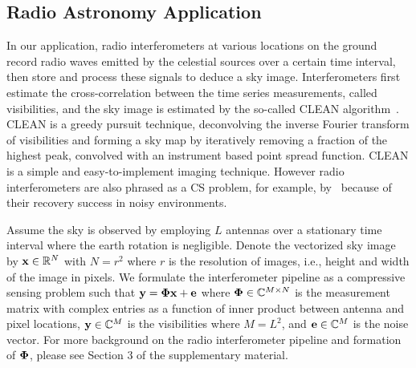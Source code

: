 \documentclass{article}
\begin{document}
\subsection{Radio Astronomy Application}

In our application, radio interferometers at various locations on the ground record radio waves emitted by the celestial sources over a certain time interval, then store and process these signals to deduce a sky image. Interferometers first estimate the cross-correlation between the time series measurements, called visibilities, and the sky image is estimated by the so-called {CLEAN} algorithm~\cite{hogbom1974clean}. {CLEAN} is a greedy pursuit technique, deconvolving the inverse Fourier transform of visibilities and forming a sky map by iteratively removing a fraction of the highest peak, convolved with an instrument based point spread function. CLEAN is a simple and easy-to-implement imaging technique. However radio interferometers are also phrased as a CS problem, for example, by~\cite{wiaux2009csforra, wenger2010csforra, li2011deconvolution} because of their recovery success in noisy environments.

Assume the sky is observed by employing $L$ antennas over a stationary time interval where the earth rotation is negligible. Denote the vectorized sky image by ${\bf x} \in \mathbb{R}^N$ with $N = {r^2}$ where $r$ is the resolution of images, i.e., height and width of the image in pixels. We formulate the interferometer pipeline as a compressive sensing problem such that ${\bf y} = {\bf \Phi} {\bf x} + {\bf e}$ where ${\bf \Phi} \in \mathbb{C}^{M\times N}$ is the measurement matrix with complex entries as a function of inner product between antenna and pixel locations, ${\bf y} \in \mathbb{C}^{M}$ is the visibilities where $M=L^2$, and ${\bf e} \in \mathbb{C}^M$ is the noise vector. For more background on the radio interferometer pipeline and formation of ${\bf \Phi}$, please see Section 3 of the supplementary material.
\end{document}
